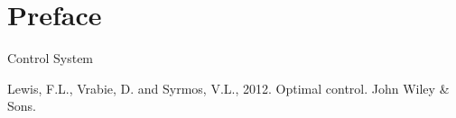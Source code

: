 \chapter*{Preface}

Control System

Lewis, F.L., Vrabie, D. and Syrmos, V.L., 2012. Optimal control. John Wiley \& Sons.
